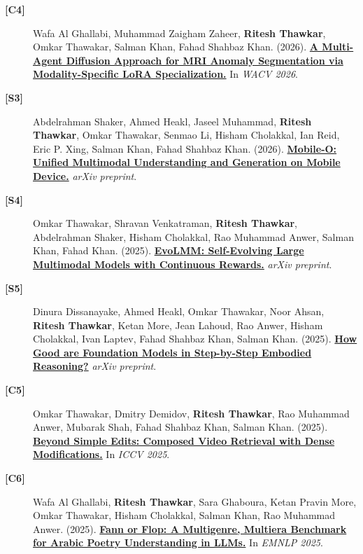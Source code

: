 \documentclass[11pt,a4paper]{article}
\begin{document}
\begin{description}
  \item[\textbf{[C4]}]
    Wafa Al Ghallabi, Muhammad Zaigham Zaheer, \textbf{Ritesh Thawkar}, Omkar Thawakar, Salman Khan, Fahad Shahbaz Khan. (2026). \href{https://doi.org/10.1109/wacv61042.2026.00021}{\textbf{A Multi-Agent Diffusion Approach for MRI Anomaly Segmentation via Modality-Specific LoRA Specialization.}} In \textit{WACV 2026}.
  \par{}
  \item[\textbf{[S3]}]
    Abdelrahman Shaker, Ahmed Heakl, Jaseel Muhammad, \textbf{Ritesh Thawkar}, Omkar Thawakar, Senmao Li, Hisham Cholakkal, Ian Reid, Eric P. Xing, Salman Khan, Fahad Shahbaz Khan. (2026). \href{https://arxiv.org/abs/2602.20161}{\textbf{Mobile-O: Unified Multimodal Understanding and Generation on Mobile Device.}} \textit{arXiv preprint}.
  \par{}
  \item[\textbf{[S4]}]
    Omkar Thawakar, Shravan Venkatraman, \textbf{Ritesh Thawkar}, Abdelrahman Shaker, Hisham Cholakkal, Rao Muhammad Anwer, Salman Khan, Fahad Khan. (2025). \href{https://arxiv.org/abs/2511.16672}{\textbf{EvoLMM: Self-Evolving Large Multimodal Models with Continuous Rewards.}} \textit{arXiv preprint}.
  \par{}
  \item[\textbf{[S5]}]
    Dinura Dissanayake, Ahmed Heakl, Omkar Thawakar, Noor Ahsan, \textbf{Ritesh Thawkar}, Ketan More, Jean Lahoud, Rao Anwer, Hisham Cholakkal, Ivan Laptev, Fahad Shahbaz Khan, Salman Khan. (2025). \href{https://arxiv.org/abs/2509.15293}{\textbf{How Good are Foundation Models in Step-by-Step Embodied Reasoning?}} \textit{arXiv preprint}.
  \par{}
  \item[\textbf{[C5]}]
    Omkar Thawakar, Dmitry Demidov, \textbf{Ritesh Thawkar}, Rao Muhammad Anwer, Mubarak Shah, Fahad Shahbaz Khan, Salman Khan. (2025). \href{https://arxiv.org/abs/2508.14039}{\textbf{Beyond Simple Edits: Composed Video Retrieval with Dense Modifications.}} In \textit{ICCV 2025}.
  \par{}
  \item[\textbf{[C6]}]
    Wafa Al Ghallabi, \textbf{Ritesh Thawkar}, Sara Ghaboura, Ketan Pravin More, Omkar Thawakar, Hisham Cholakkal, Salman Khan, Rao Muhammad Anwer. (2025). \href{https://arxiv.org/abs/2505.18152}{\textbf{Fann or Flop: A Multigenre, Multiera Benchmark for Arabic Poetry Understanding in LLMs.}} In \textit{EMNLP 2025}.

\end{description}
\end{document}
